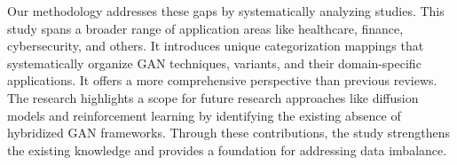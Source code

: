 Our methodology addresses these gaps by systematically analyzing studies. This study spans a broader range of application areas like healthcare, finance, cybersecurity, and others. It introduces unique categorization mappings that systematically organize GAN techniques, variants, and their domain-specific applications. It offers a more comprehensive perspective than previous reviews. The research highlights a scope for future research approaches like diffusion models and reinforcement learning by identifying the existing absence of hybridized GAN frameworks. Through these contributions, the study strengthens the existing knowledge and provides a foundation for addressing data imbalance.
